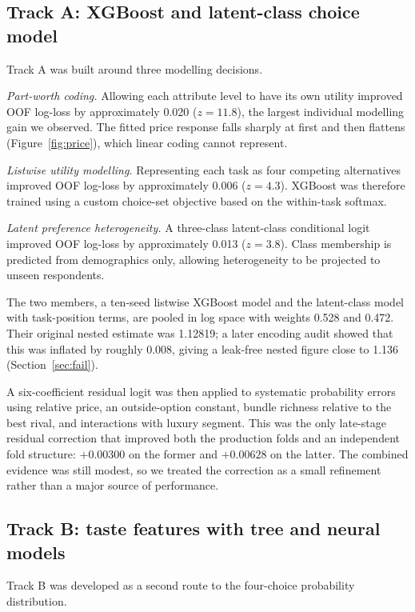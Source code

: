 \documentclass[11pt]{article}
\begin{document}
\subsection{Track A: XGBoost and latent-class choice model}

Track A was built around three modelling decisions.

\emph{Part-worth coding.} Allowing each attribute level to have its own utility improved
OOF log-loss by approximately 0.020 ($z=11.8$), the largest individual modelling gain we
observed. The fitted price response falls sharply at first and then flattens
(Figure~\ref{fig:price}), which linear coding cannot represent.

\emph{Listwise utility modelling.} Representing each task as four competing alternatives
improved OOF log-loss by approximately 0.006 ($z=4.3$). XGBoost was therefore trained
using a custom choice-set objective based on the within-task softmax.

\emph{Latent preference heterogeneity.} A three-class latent-class conditional logit
improved OOF log-loss by approximately 0.013 ($z=3.8$). Class membership is predicted
from demographics only, allowing heterogeneity to be projected to unseen respondents.

The two members, a ten-seed listwise XGBoost model and the latent-class model with
task-position terms, are pooled in log space with weights 0.528 and 0.472. Their original
nested estimate was 1.12819; a later encoding audit showed that this was inflated by
roughly 0.008, giving a leak-free nested figure close to 1.136
(Section~\ref{sec:fail}).

A six-coefficient residual logit was then applied to systematic probability errors using
relative price, an outside-option constant, bundle richness relative to the best rival,
and interactions with luxury segment. This was the only late-stage residual correction
that improved both the production folds and an independent fold structure: $+0.00300$ on
the former and $+0.00628$ on the latter. The combined evidence was still modest, so we
treated the correction as a small refinement rather than a major source of performance.

\subsection{Track B: taste features with tree and neural models}

Track B was developed as a second route to the four-choice probability
distribution.
\end{document}
